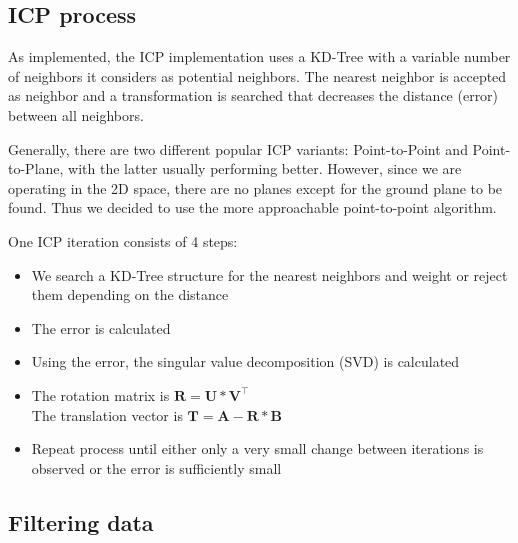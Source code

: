 \documentclass[10pt,twocolumn,letterpaper]{article}
\newcommand{\matr}[1]{\mathbf{#1}} %
\begin{document}
\subsection{ICP process}

As implemented, the ICP implementation uses a KD-Tree with a variable number of neighbors it considers as potential neighbors. The nearest neighbor is accepted as neighbor and a transformation is searched that decreases the distance (error) between all neighbors. 

Generally, there are two different popular ICP variants: Point-to-Point and Point-to-Plane, with the latter usually performing better. However, since we are operating in the 2D space, there are no planes except for the ground plane to be found. Thus we decided to use the more approachable point-to-point algorithm.

One ICP iteration consists of 4 steps:

\begin{itemize}
   \item We search a KD-Tree structure for the nearest neighbors and weight or reject them depending on the distance
   \item The error is calculated
   \item Using the error, the singular value decomposition (SVD) is calculated
   \item The rotation matrix is $\matr{R} =\matr{U} * \matr{V}^{\intercal}$
      \\ The translation vector is $\matr{T} = \matr{A} - \matr{R} * \matr{B}$
    \item Repeat process until either only a very small change between iterations is observed or the error is sufficiently small
\end{itemize}

\subsection{Filtering data}
\end{document}
